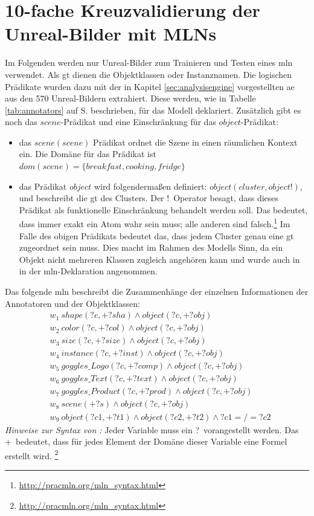 \section{10-fache Kreuzvalidierung der Unreal-Bilder mit MLNs}
\label{sec:onlyUnrealImages}
Im Folgenden werden nur Unreal-Bilder zum Trainieren und Testen eines \gls{mln} verwendet. Als \gls{gt} dienen die Objektklassen oder Instanznamen. Die logischen Prädikate wurden dazu mit der in Kapitel \ref{sec:analysisengine} vorgestellten \gls{ae} aus den 570 Unreal-Bildern extrahiert. Diese werden, wie in Tabelle \ref{tab:annotators} auf S.\pageref{tab:annotators} beschrieben, für das Modell deklariert.  Zusätzlich gibt es noch das $scene$-Prädikat und eine Einschränkung für das $object$-Prädikat:
\begin{itemize}
\item das $scene(scene)$ Prädikat ordnet die Szene in einen räumlichen Kontext ein. Die Domäne für das Prädikat ist $dom(scene) = \{breakfast, cooking, fridge\}$
\item das Prädikat $object$ wird folgendermaßen definiert: $object(cluster, object!)$, und beschreibt die \gls{gt} des Clusters. Der \glqq!\grqq \ Operator besagt, dass dieses Prädikat als funktionelle Einschränkung behandelt werden soll. Das bedeutet, dass immer exakt ein Atom wahr sein muss; alle anderen sind falsch.\footnote{\url{http://pracmln.org/mln_syntax.html}} Im Falle des obigen Prädikats bedeutet das, dass jedem Cluster genau eine \gls{gt} zugeordnet sein muss. Dies macht im Rahmen des Modells Sinn, da ein Objekt nicht mehreren Klassen zugleich angehören kann und wurde auch in \cite{pr2looking} in der \gls{mln}-Deklaration angenommen.
\end{itemize}
Das folgende \gls{mln} beschreibt die Zusammenhänge der einzelnen Informationen der Annotatoren und der Objektklassen:
\begin{align*}
& w_{1} \ shape(?c, +?sha) \wedge object(?c, +?obj) \\
& w_{2} \ color(?c, +?col) \wedge object(?c, +?obj) \\
& w_{3} \ size(?c, +?size) \wedge object(?c, +?obj) \\
& w_{4} \ instance(?c, +?inst) \wedge object(?c, +?obj) \\
& w_{5} \ goggles\_Logo(?c, +?comp) \wedge object(?c, +?obj)\\
& w_{6} \ goggles\_Text(?c, +?text) \wedge object(?c, +?obj)\\
& w_{7} \ goggles\_Product(?c, +?prod) \wedge object(?c, +?obj)\\
& w_{8} \ scene(+?s) \wedge object(?c, +?obj)\\
& w_{9} \ object(?c1, +?t1) \wedge object(?c2, +?t2) \wedge ?c1 =/= ?c2
\end{align*}
\textit{Hinweise zur Syntax von \pracmln:} Jeder Variable muss ein \glqq ?\grqq \ vorangestellt werden. Das \glqq +\grqq \ bedeutet, dass für jedes Element der Domäne dieser Variable eine Formel erstellt wird. \footnote{\url{http://pracmln.org/mln_syntax.html}}  \par
 
